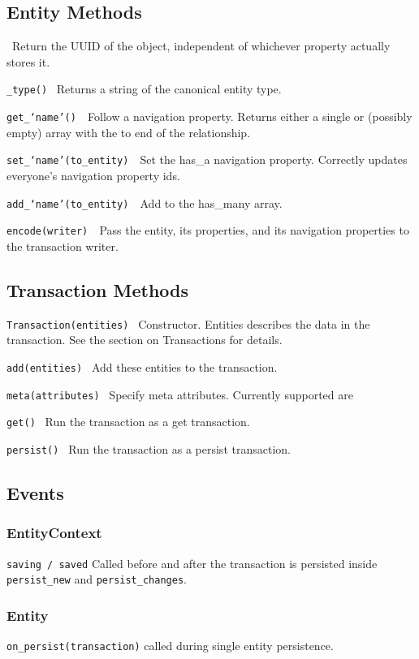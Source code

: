 \documentclass{article}
\newcommand{\ilcode}{\tt}
\begin{document}
\subsection{Entity Methods}
\indent {\ilcode id()} \
		Return the UUID of the object, independent of whichever property
		actually stores it.

	{\ilcode \_type()} \
		Returns a string of the canonical entity type.

	{\ilcode get\_`name'() }\
		Follow a navigation property. Returns either a single or (possibly
		empty) array with the to end of the relationship.

	{\ilcode set\_`name'(to\_entity) }\
		Set the has\_a navigation property. Correctly updates everyone's
		navigation property ids.

	{\ilcode add\_`name'(to\_entity) }\
		Add to the has\_many array.

	{\ilcode encode(writer) }\
		Pass the entity, its properties, and its navigation properties to the
		transaction writer.

\subsection{Transaction Methods}
	{\ilcode Transaction(entities) }
		Constructor. Entities describes the data in the transaction. See the
		section on Transactions for details.

	{\ilcode add(entities) }
		Add these entities to the transaction.

	{\ilcode meta(attributes) }
		Specify meta attributes. Currently supported are

	{\ilcode get() }
		Run the transaction as a get transaction.

	{\ilcode persist() }
		Run the transaction as a persist transaction.

\subsection{Events}
\subsubsection{EntityContext}
{\ilcode saving / saved} Called before and after the transaction is persisted inside
{\ilcode persist\_new} and {\ilcode persist\_changes}.

\subsubsection{Entity}
{\ilcode on\_persist(transaction)} called during single entity persistence.
\end{document}
